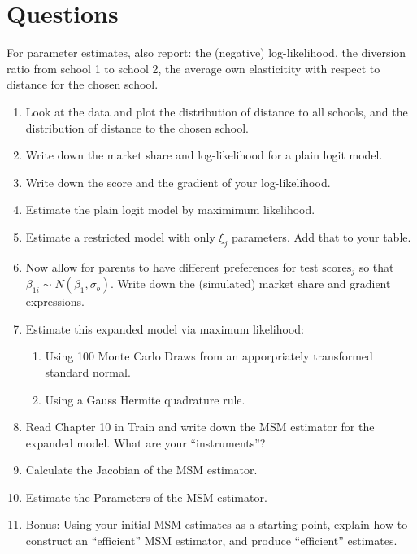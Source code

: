 \documentclass{article}
\begin{document}
\section*{\normalsize Questions}
For parameter estimates, also report: the (negative) log-likelihood, the diversion ratio from school 1 to school 2, the average own elasticitity with respect to distance for the chosen school.
\begin{enumerate}
	\item Look at the data and plot the distribution of distance to all schools, and the distribution of distance to the chosen school.
	\item Write down the market share and log-likelihood for a plain logit model.
	\item Write down the score and the gradient of your log-likelihood.
	\item Estimate the plain logit model by maximimum likelihood. 
	\item Estimate a restricted model with only $\xi_j$ parameters. Add that to your table. 
	\item Now allow for parents to have different preferences for $ \text{test scores}_j$ so that $\beta_{1i}\sim N(\beta_1,\sigma_b)$. Write down the (simulated) market share and gradient expressions.

	\item Estimate this expanded model via maximum likelihood:
	\begin{enumerate}
		\item Using 100 Monte Carlo Draws from an apporpriately transformed standard normal.
		\item Using a Gauss Hermite quadrature rule.
	\end{enumerate}
	\item Read Chapter 10 in Train and write down the MSM estimator for the expanded model. What are your ``instruments''?
	\item Calculate the Jacobian of the MSM estimator.
	\item Estimate the Parameters of the MSM estimator.
	\item Bonus: Using your initial MSM estimates as a starting point, explain how to construct an ``efficient'' MSM estimator, and produce ``efficient'' estimates.
\end{enumerate}
\end{document}
